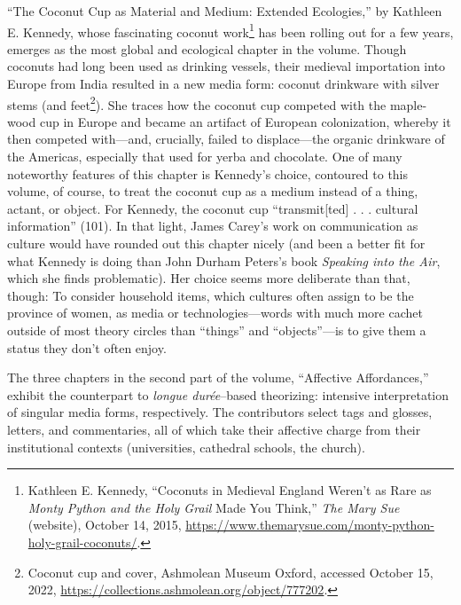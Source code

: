 \documentclass{tufte-handout}
\begin{document}
``The Coconut Cup as Material and Medium: Extended Ecologies,'' by
Kathleen E. Kennedy, whose fascinating coconut work\footnote{Kathleen E.
  Kennedy, ``Coconuts in Medieval England Weren't as Rare as \emph{Monty
  Python and the Holy Grail} Made You Think,'' \emph{The Mary Sue}
  (website), October 14, 2015,
  \url{https://www.themarysue.com/monty-python-holy-grail-coconuts/}.} has
been rolling out for a few years, emerges as the most global and
ecological chapter in the volume. Though coconuts had long been used as
drinking vessels, their medieval importation into Europe from India
resulted in a new media form: coconut drinkware with silver stems (and
feet\footnote{Coconut cup and cover, Ashmolean Museum Oxford, accessed
  October 15, 2022, \url{https://collections.ashmolean.org/object/777202}.}).
She traces how the coconut cup competed with the maple-wood cup in
Europe and became an artifact of European colonization, whereby it then
competed with---and, crucially, failed to displace---the organic
drinkware of the Americas, especially that used for yerba and chocolate.
One of many noteworthy features of this chapter is Kennedy's choice,
contoured to this volume, of course, to treat the coconut cup as a
medium instead of a thing, actant, or object. For Kennedy, the coconut
cup ``transmit{[}ted{]} . . . cultural information'' (101). In that
light, James Carey's work on communication as culture would have rounded
out this chapter nicely (and been a better fit for what Kennedy is doing
than John Durham Peters's book \emph{Speaking into the Air}, which she
finds problematic). Her choice seems more deliberate than that, though:
To consider household items, which cultures often assign to be the
province of women, as media or technologies---words with much more
cachet outside of most theory circles than ``things'' and
``objects''---is to give them a status they don't often enjoy.

The three chapters in the second part of the volume, ``Affective
Affordances,'' exhibit the counterpart to \emph{longue durée}--based
theorizing: intensive interpretation of singular media forms,
respectively. The contributors select tags and glosses, letters, and
commentaries, all of which take their affective charge from their
institutional contexts (universities, cathedral schools, the church).
\end{document}
